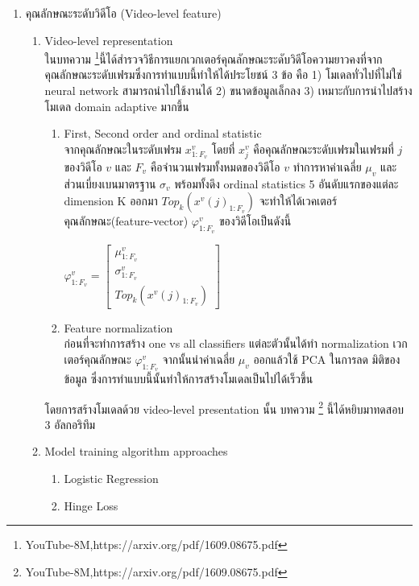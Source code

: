 \begin{enumerate}
\begin{enumerate}
\begin{figure}[!ht]
    		\label{fig:BSS}
		\end{figure}
	\end{enumerate}
	\item คุณลักษณะระดับวิดีโอ (Video-level feature)
	\begin{enumerate}
		\setlength\itemsep{-0.25em}
		\item Video-level representation 
		\\ ในบทความ \footnote{YouTube-8M,https://arxiv.org/pdf/1609.08675.pdf}นี้ได้สำรวจวิธีการแยกเวกเตอร์คุณลักษณะระดับวิดีโอความยาวคงที่จากคุณลักษณะระดับเฟรมซึ่งการทำแบบนี้ทำให้ได้ประโยชน์ 3 ข้อ คือ 1) โมเดลทั่วไปที่ไม่ใช่ neural network สามารถนำไปใช้งานได้  2) ขนาดข้อมูลเล็กลง  3) เหมาะกับการนำไปสร้างโมเดล domain adaptive มากขึ้น
		\begin{enumerate}
			\setlength\itemsep{-0.25em}
			\item First, Second order and ordinal statistic
			\\ จากคุณลักษณะในระดับเฟรม $x_{1:F_{v}}^{v}$ โดยที่ $x_{j}^{v}$ คือคุณลักษณะระดับเฟรมในเฟรมที่ $j$ ของวิดีโอ $v$ และ $F_{v}$ คือจำนวนเฟรมทั้งหมดของวิดีโอ $v$ ทำการหาค่าเฉลี่ย $\mu_{v}$ และส่วนเบี่ยงเบนมาตรฐาน $\sigma_{v}$ พร้อมทั้งดึง ordinal statistics 5 อันดับแรกของแต่ละ dimension K ออกมา $Top_{k}(x^{v}(j)_{1:F_{v}})$ จะทำให้ได้เวคเตอร์คุณลักษณะ(feature-vector) $\varphi_{1:F_{v}}^{v}$ ของวิดีโอเป็นดังนี้ \\
			\centerline{$\varphi_{1:F_{v}}^{v} = \begin{bmatrix}
								\mu_{1:F_{v}}^{v}\\ 
								\sigma_{1:F_{v}}^{v}\\ 
								Top_{k}(x^{v}(j)_{1:F_{v}})
								\end{bmatrix}$}
			\item Feature normalization \\
			ก่อนที่จะทำการสร้าง one vs all classifiers แต่ละตัวนั้นได้ทำ normalization เวกเตอร์คุณลักษณะ $\varphi_{1:F_{v}}^{v}$ จากนั้นนำค่าเฉลี่ย $\mu_{v}$ ออกแล้วใช้ PCA ในการลด มิติของข้อมูล ซึ่งการทำแบบนี้นั้นทำให้การสร้างโมเดลเป็นไปได้เร็วขึ้น
		\end{enumerate}
		โดยการสร้างโมเดลด้วย video-level presentation นั้น บทความ \footnote{YouTube-8M,https://arxiv.org/pdf/1609.08675.pdf} นี้ได้หยิบมาทดสอบ 3 อัลกอริทึม
		\item Model training algorithm approaches 
		\begin{enumerate}
			\setlength\itemsep{-0.25em}
			\item Logistic Regression
			\item Hinge Loss

\end{enumerate}
\end{enumerate}
\end{enumerate}
